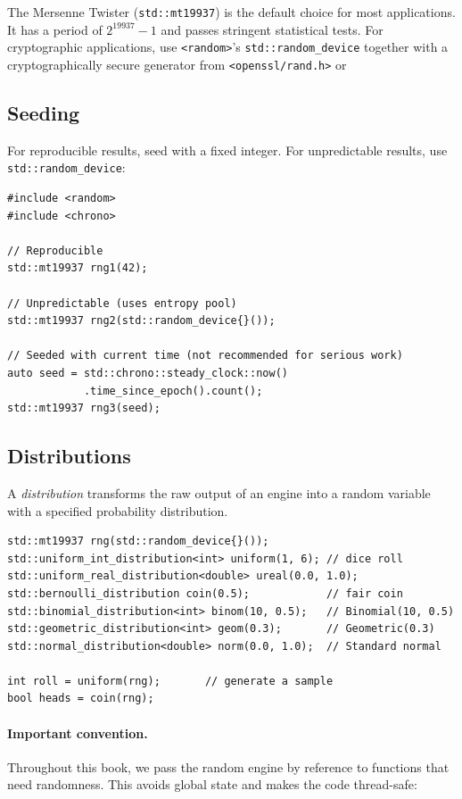 \documentclass[twoside,12pt]{book}
\theoremstyle{plain}
\theoremstyle{definition}
\theoremstyle{remark}
\begin{document}
The Mersenne Twister (\texttt{std::mt19937}) is the default choice for
most applications. It has a period of $2^{19937}-1$ and passes stringent
statistical tests. For cryptographic applications, use
\texttt{<random>}'s \texttt{std::random\_device} together with a
cryptographically secure generator from \texttt{<openssl/rand.h>} or

\subsection{Seeding}

For reproducible results, seed with a fixed integer. For unpredictable
results, use \texttt{std::random\_device}:

\begin{lstlisting}[caption={Seeding strategies}]
#include <random>
#include <chrono>

// Reproducible
std::mt19937 rng1(42);

// Unpredictable (uses entropy pool)
std::mt19937 rng2(std::random_device{}());

// Seeded with current time (not recommended for serious work)
auto seed = std::chrono::steady_clock::now()
            .time_since_epoch().count();
std::mt19937 rng3(seed);
\end{lstlisting}

\subsection{Distributions}

A \emph{distribution} transforms the raw output of an engine into a
random variable with a specified probability distribution.

\begin{lstlisting}[caption={Common distributions}]
std::mt19937 rng(std::random_device{}());
std::uniform_int_distribution<int> uniform(1, 6); // dice roll
std::uniform_real_distribution<double> ureal(0.0, 1.0);
std::bernoulli_distribution coin(0.5);            // fair coin
std::binomial_distribution<int> binom(10, 0.5);   // Binomial(10, 0.5)
std::geometric_distribution<int> geom(0.3);       // Geometric(0.3)
std::normal_distribution<double> norm(0.0, 1.0);  // Standard normal

int roll = uniform(rng);       // generate a sample
bool heads = coin(rng);
\end{lstlisting}

\paragraph{Important convention.}
Throughout this book, we pass the random engine by reference to functions
that need randomness. This avoids global state and makes the code
thread-safe:
\end{document}
